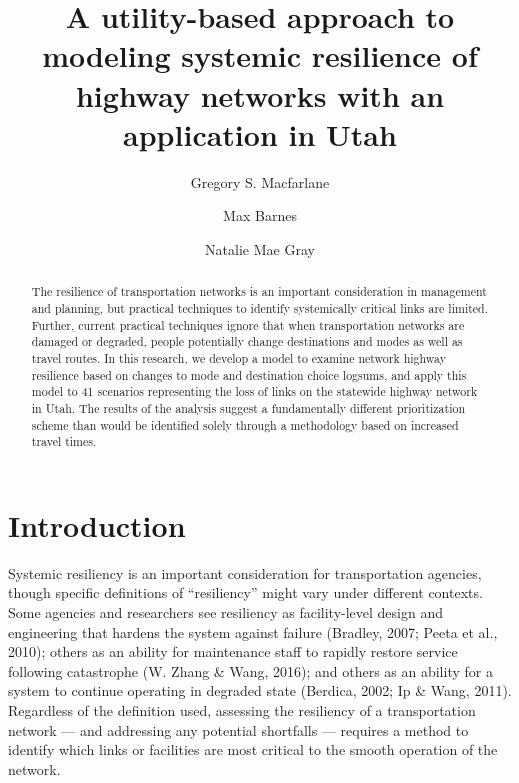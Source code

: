 \documentclass[
  letterpaper,
  number,
  review,
  3p]{elsarticle}
\begin{document}
\begin{frontmatter}
\title{A utility-based approach to modeling systemic resilience of
highway networks with an application in Utah}
\author[1]{Gregory S. Macfarlane%
%
}
\author[1]{Max Barnes%
%
}
\author[1]{Natalie Mae Gray%
%
}





        
\begin{abstract}
The resilience of transportation networks is an important consideration
in management and planning, but practical techniques to identify
systemically critical links are limited. Further, current practical
techniques ignore that when transportation networks are damaged or
degraded, people potentially change destinations and modes as well as
travel routes. In this research, we develop a model to examine network
highway resilience based on changes to mode and destination choice
logsums, and apply this model to 41 scenarios representing the loss of
links on the statewide highway network in Utah. The results of the
analysis suggest a fundamentally different prioritization scheme than
would be identified solely through a methodology based on increased
travel times.
\end{abstract}





\end{frontmatter}
    \ifdefined\Shaded\renewenvironment{Shaded}{\begin{tcolorbox}[breakable, boxrule=0pt, enhanced, interior hidden, borderline west={3pt}{0pt}{shadecolor}, sharp corners, frame hidden]}{\end{tcolorbox}}\fi


\hypertarget{intro}{%
\section{Introduction}\label{intro}}

Systemic resiliency is an important consideration for transportation
agencies, though specific definitions of ``resiliency'' might vary under
different contexts. Some agencies and researchers see resiliency as
facility-level design and engineering that hardens the system against
failure (Bradley, 2007; Peeta et al., 2010); others as an ability for
maintenance staff to rapidly restore service following catastrophe (W.
Zhang \& Wang, 2016); and others as an ability for a system to continue
operating in degraded state (Berdica, 2002; Ip \& Wang, 2011).
Regardless of the definition used, assessing the resiliency of a
transportation network --- and addressing any potential shortfalls ---
requires a method to identify which links or facilities are most
critical to the smooth operation of the network.
\end{document}
